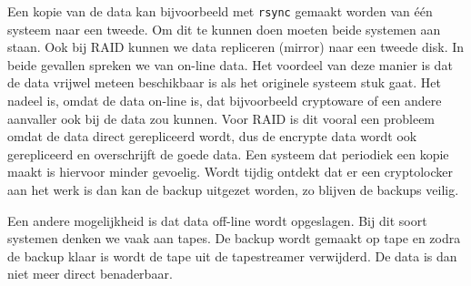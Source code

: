 Een kopie van de data kan bijvoorbeeld met \texttt{rsync} gemaakt worden van \'e\'en systeem naar een tweede. Om dit te kunnen doen moeten beide systemen aan staan. Ook bij RAID kunnen we data repliceren (mirror) naar een tweede disk. In beide gevallen spreken we van on-line data. Het voordeel van deze manier is dat de data vrijwel meteen beschikbaar is als het originele systeem stuk gaat. Het nadeel is, omdat de data on-line is, dat bijvoorbeeld cryptoware of een andere aanvaller ook bij de data zou kunnen. Voor RAID is dit vooral een probleem omdat de data direct gerepliceerd wordt, dus de encrypte data wordt ook gerepliceerd en overschrijft de goede data. Een systeem dat periodiek een kopie maakt is hiervoor minder gevoelig. Wordt tijdig ontdekt dat er een cryptolocker aan het werk is dan kan de backup uitgezet worden, zo blijven de backups veilig.

Een andere mogelijkheid is dat data off-line wordt opgeslagen. Bij dit soort systemen denken we vaak aan tapes. De backup wordt gemaakt op tape en zodra de backup klaar is wordt de tape uit de tapestreamer verwijderd. De data is dan niet meer direct benaderbaar.

